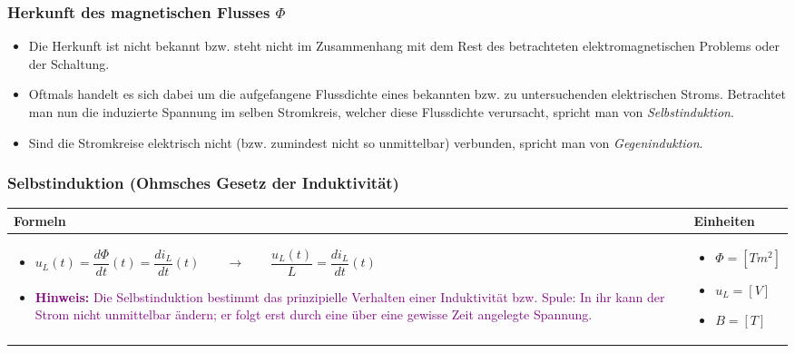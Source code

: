 \subsubsection{Herkunft des magnetischen Flusses $\Phi$}
\begin{itemize}
	\item Die Herkunft ist nicht bekannt bzw. steht nicht im Zusammenhang mit dem Rest des betrachteten
	elektromagnetischen Problems oder der Schaltung.
	\item Oftmals handelt es sich dabei um die aufgefangene Flussdichte eines bekannten bzw. zu untersuchenden
	elektrischen Stroms. Betrachtet man nun die induzierte Spannung im selben
	Stromkreis, welcher diese Flussdichte verursacht, spricht man von \emph{Selbstinduktion}.
	\item Sind die Stromkreise elektrisch nicht (bzw. zumindest nicht so unmittelbar) verbunden, spricht
	man von \emph{Gegeninduktion}.
\end{itemize}

\subsubsection{Selbstinduktion (Ohmsches Gesetz der Induktivität)}
\begin{tabular}{ | m{15cm} | m{3cm}  | }
	\hline
	Formeln & Einheiten \\ \hline
	\hline
	\begin{itemize}
		\item[] $u_L(t)=\dfrac{d\Phi}{dt}(t)=\dfrac{di_L}{dt}(t) \qquad \rightarrow \qquad \dfrac{u_L(t)}{L}=\dfrac{di_L}{dt}(t)$
		\item[] \textcolor{purple}{\textbf{Hinweis:} Die Selbstinduktion bestimmt das prinzipielle Verhalten einer Induktivität bzw. Spule: In ihr kann der Strom nicht unmittelbar ändern; er folgt erst durch eine über
			eine gewisse Zeit angelegte Spannung.}
	\end{itemize} 
	&   	
	\begin{itemize}
		\item[] $\Phi=[Tm^2]$
		\item[] $u_L=[V]$
		\item[] $B=[T]$
	\end{itemize} 
	\\ \hline
\end{tabular}

